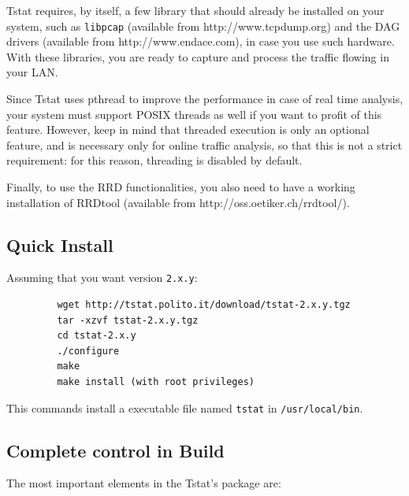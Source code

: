 \documentclass[11pt]{article}
\begin{document}
Tstat requires, by itself, a few library that should
already be installed on your system, such as 
\texttt{libpcap} (available from \textsf{http://www.tcpdump.org}) 
and the DAG drivers (available from \textsf{http://www.endace.com}), 
in case you use such hardware. With these libraries, 
you are ready to capture and process the traffic flowing
in your LAN.



Since Tstat uses pthread to improve the performance in case of real time
analysis, your system must support POSIX threads as well if you want to
profit of this feature. However, keep in mind that threaded execution 
is only an optional feature, and is necessary only for online traffic
analysis, so that this is not a strict requirement: for this reason,
threading is disabled by default.



Finally, to use the RRD functionalities, you also need to have a working
installation of RRDtool (available from \textsf{http://oss.oetiker.ch/rrdtool/}).

\subsection{Quick Install\label{Quick_Install}}


Assuming that you want version \texttt{2.x.y}:

\begin{small}\begin{verbatim}
         wget http://tstat.polito.it/download/tstat-2.x.y.tgz
         tar -xzvf tstat-2.x.y.tgz
         cd tstat-2.x.y
         ./configure
         make
         make install (with root privileges)
\end{verbatim}\end{small} \noindent
This commands install a executable file named \texttt{tstat} in \texttt{/usr/local/bin}.

\subsection{Complete control in Build\label{Complete_control_in_Build}}


The most important elements in the Tstat's package are:
\end{document}

